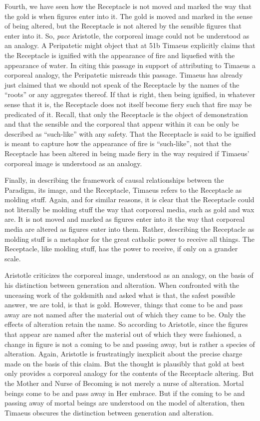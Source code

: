 Fourth, we have seen how the Receptacle is not moved and marked the way that the gold is when figures enter into it. The gold is moved and marked in the sense of being altered, but the Receptacle is not altered by the sensible figures that enter into it. So, \emph{pace} Aristotle, the corporeal image could not be understood as an analogy. A Peripatetic might object that at 51b Timaeus explicitly claims that the Receptacle is ignified with the appearance of fire and liquefied with the appearance of water. In citing this passage in support of attributing to Timaeus a corporeal analogy, the Peripatetic misreads this passage. Timaeus has already just claimed that we should not speak of the Receptacle by the names of the ``roots'' or any aggregates thereof. If that is right, then being ignified, in whatever sense that it is, the Receptacle does not itself become fiery such that fire may be predicated of it. Recall, that only the Receptacle is the object of demonstration and that the sensible and the corporeal that appear within it can be only be described as ``such-like'' with any safety. That the Receptacle is said to be ignified is meant to capture how the appearance of fire is ``such-like'', not that the Receptacle has been altered in being made fiery in the way required if Timaeus' corporeal image is understood as an analogy. 

Finally, in describing the framework of causal relationships between the Paradigm, its image, and the Receptacle, Timaeus refers to the Receptacle as molding stuff. Again, and for similar reasons, it is clear that the Receptacle could not literally be molding stuff the way that corporeal media, such as gold and wax are. It is not moved and marked as figures enter into it the way that corporeal media are altered as figures enter into them. Rather, describing the Receptacle as molding stuff is a metaphor for the great catholic power to receive all things. The Receptacle, like molding stuff, has the power to receive, if only on a grander scale.

Aristotle criticizes the corporeal image, understood as an analogy, on the basis of his distinction between generation and alteration. When confronted with the unceasing work of the goldsmith and asked what is that, the safest possible answer, we are told, is that is gold. However, things that come to be and pass away are not named after the material out of which they came to be. Only the effects of alteration retain the name. So according to Aristotle, since the figures that appear are named after the material out of which they were fashioned, a change in figure is not a coming to be and passing away, but is rather a species of alteration. Again, Aristotle is frustratingly inexplicit about the precise charge made on the basis of this claim. But the thought is plausibly that gold at best only provides a corporeal analogy for the contents of the Receptacle altering. But the Mother and Nurse of Becoming is not merely a nurse of alteration. Mortal beings come to be and pass away in Her embrace. But if the coming to be and passing away of mortal beings are understood on the model of alteration, then Timaeus obscures the distinction between generation and alteration.

